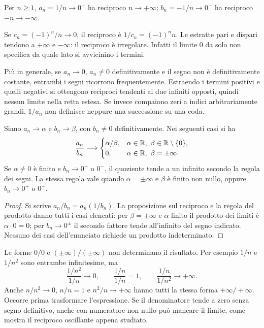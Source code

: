 \begin{esempio}
Per $n\ge1$, $a_n=1/n\to0^+$ ha reciproco $n\to+\infty$; $b_n=-1/n\to0^-$ ha reciproco $-n\to-\infty$.

Se $c_n=(-1)^n/n\to0$, il reciproco è $1/c_n=(-1)^n n$. Le estratte pari e dispari tendono a $+\infty$ e $-\infty$: il reciproco è irregolare. Infatti il limite $0$ da solo non specifica da quale lato si avvicinino i termini.
\end{esempio}

Più in generale, se $a_n\to0$, $a_n\ne0$ definitivamente e il segno non è definitivamente costante, entrambi i segni ricorrono frequentemente. Estraendo i termini positivi e quelli negativi si ottengono reciproci tendenti ai due infiniti opposti, quindi nessun limite nella retta estesa. Se invece compaiono zeri a indici arbitrariamente grandi, $1/a_n$ non definisce neppure una successione su una coda.

\begin{teorema}
\label{teo:limite-quoziente}
Siano $a_n\to\alpha$ e $b_n\to\beta$, con $b_n\ne0$ definitivamente. Nei seguenti casi si ha
\[
\frac{a_n}{b_n}\longrightarrow
\begin{cases}
\alpha/\beta,&\alpha\in\mathbb{R},\ \beta\in\mathbb{R}\setminus\{0\},\\
0,&\alpha\in\mathbb{R},\ \beta=\pm\infty.
\end{cases}
\]
Se $\alpha\ne0$ è finito e $b_n\to0^+$ o $0^-$, il quoziente tende a un infinito secondo la regola dei segni. La stessa regola vale quando $\alpha=\pm\infty$ e $\beta$ è finito non nullo, oppure $b_n\to0^+$ o $0^-$.
\end{teorema}
\begin{proof}
Si scrive $a_n/b_n=a_n(1/b_n)$. La proposizione sul reciproco e la regola del prodotto danno tutti i casi elencati: per $\beta=\pm\infty$ e $\alpha$ finito il prodotto dei limiti è $\alpha\cdot0=0$; per $b_n\to0^\pm$ il secondo fattore tende all'infinito del segno indicato. Nessuno dei casi dell'enunciato richiede un prodotto indeterminato.
\end{proof}

\begin{osservazione}
Le forme $0/0$ e $(\pm\infty)/(\pm\infty)$ non determinano il risultato. Per esempio $1/n$ e $1/n^2$ sono entrambe infinitesime, ma
\[
\frac{1/n^2}{1/n}\to0,\qquad
\frac{1/n}{1/n}=1,\qquad
\frac{1/n}{1/n^2}\to+\infty.
\]
Anche $n/n^2\to0$, $n/n=1$ e $n^2/n\to+\infty$ hanno tutti la stessa forma $+\infty/+\infty$. Occorre prima trasformare l'espressione. Se il denominatore tende a zero senza segno definitivo, anche con numeratore non nullo può mancare il limite, come mostra il reciproco oscillante appena studiato.
\end{osservazione}
